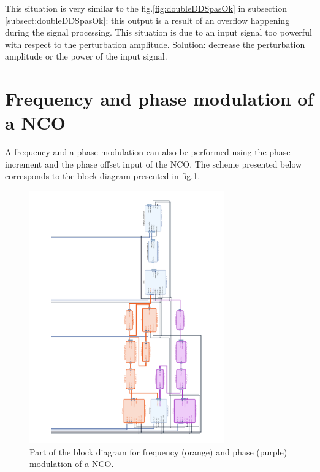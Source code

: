 \documentclass[12pt,oneside]{article}
\begin{document}
This situation is very similar to the fig.\ref{fig:doubleDDSpasOk} in subsection \ref{subsect:doubleDDSpasOk}: this output is a result of an overflow happening during the signal processing. This situation is due to an input signal too powerful with respect to the perturbation amplitude.
Solution: decrease the perturbation amplitude or the power of the input signal. 


\section{Frequency and phase modulation of a NCO}\label{sect:FMPM}

A frequency and a phase modulation can also be performed using the phase increment and the phase offset input of the NCO. The scheme presented below corresponds to the block diagram presented in fig.\ref{fig:mod_phase}.

\begin{figure}[h!tbp]
	\begin{center}
		\vspace{-3.5cm}
		\includegraphics[width=8.4cm,trim={10cm 1cm 2.5cm 0cm}, clip]{design/FMPM3.pdf}
		\caption{Part of the block diagram for frequency (orange) and phase (purple) modulation of a NCO.}
		\label{fig:mod_phase}
	\end{center}
\end{figure}
\end{document}
